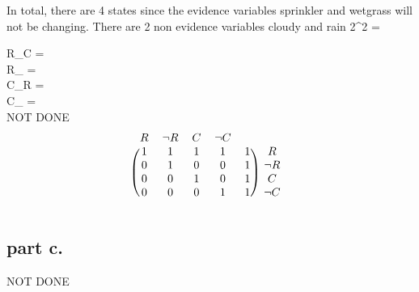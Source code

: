   In total, there are 4 states since the evidence variables sprinkler and wetgrass will not be changing.
  There are 2 non evidence variables cloudy and rain 2^2 = 

\noindent
R\_C       =  \\
R\_ =  \\
C\_R       =  \\
C\_ =   \\

NOT DONE
  \[
\begin{blockarray}{cccccc}
R & \neg{R} & C & \neg{C} \\
\begin{block}{(ccccc)c}
  1 & 1 & 1 & 1 & 1 & R \\
  0 & 1 & 0 & 0 & 1 & \neg{R} \\
  0 & 0 & 1 & 0 & 1 & C \\
  0 & 0 & 0 & 1 & 1 & \neg{C} \\
\end{block}
\end{blockarray}
 \]

\subsection{part c.}

  NOT DONE
